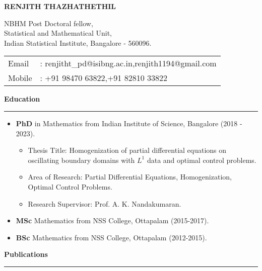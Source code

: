 \documentclass[a4paper,11pt]{letter}
\begin{document}
		
	\textbf{\Large RENJITH THAZHATHETHIL}\smallskip
	
	NBHM Post Doctoral fellow,\\
	Statistical and Mathematical Unit,\\
	Indian Statistical Institute, Bangalore - 560096.\smallskip
	
	\hspace*{-0.6em}\begin{tabular}{ll}
		Email&: renjitht\_pd@isibng.ac.in,\quad renjith1194@gmail.com\\
		Mobile&: +91 98470 63822,\quad +91 82810 33822
	\end{tabular}
	
	\textbf{\large Education}\smallskip\hrule
	
	\begin{itemize}
		\item \textbf{PhD} in Mathematics from Indian Institute of Science, Bangalore (2018 - 2023).
		\begin{itemize}
			\item Thesis Title: Homogenization of partial differential equations on oscillating boundary domains with $L^1$ data and optimal control problems.
			\item Area of Research: Partial Differential Equations, Homogenization, Optimal Control Problems.
			\item Research Supervisor: Prof. A. K. Nandakumaran.
		\end{itemize}
		\item \textbf{MSc} Mathematics from NSS College, Ottapalam (2015-2017).	
		
		\item \textbf{BSc} Mathematics from NSS College, Ottapalam (2012-2015). 
	\end{itemize}

	\textbf{\large Publications}\smallskip\hrule
	
\end{document}
